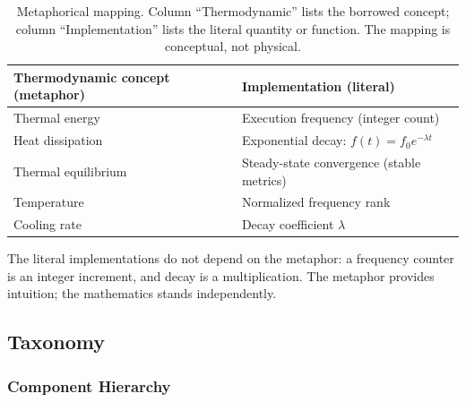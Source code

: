 \begin{table}[h]
\centering
\caption{Metaphorical mapping. Column ``Thermodynamic'' lists the borrowed
concept; column ``Implementation'' lists the literal quantity or function.
The mapping is conceptual, not physical.}
\begin{tabular}{ll}
\toprule
\textbf{Thermodynamic concept (metaphor)} & \textbf{Implementation (literal)} \\
\midrule
Thermal energy & Execution frequency (integer count) \\
Heat dissipation & Exponential decay: $f(t) = f_0 e^{-\lambda t}$ \\
Thermal equilibrium & Steady-state convergence (stable metrics) \\
Temperature & Normalized frequency rank \\
Cooling rate & Decay coefficient $\lambda$ \\
\bottomrule
\end{tabular}
\end{table}

The literal implementations do not depend on the metaphor: a frequency
counter is an integer increment, and decay is a multiplication. The metaphor
provides intuition; the mathematics stands independently.

\subsection{Taxonomy}

\subsubsection{Component Hierarchy}


